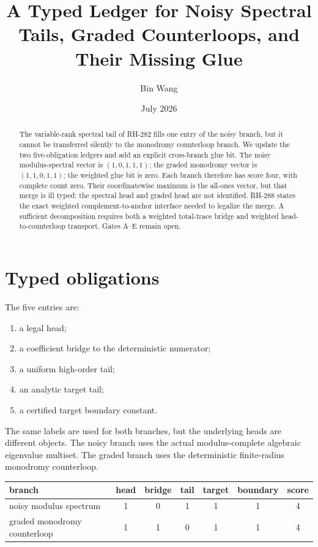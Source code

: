 \documentclass[11pt]{article}
\title{A Typed Ledger for Noisy Spectral Tails, Graded Counterloops, and Their Missing Glue}
\author{Bin Wang}\date{July 2026}
\theoremstyle{remark}\newtheorem{remark}[proposition]{Remark}
\begin{document}
\maketitle
\begin{abstract}
The variable-rank spectral tail of RH-282 fills one entry of the noisy branch,
but it cannot be transferred silently to the monodromy counterloop branch.
We update the two five-obligation ledgers and add an explicit cross-branch
glue bit.  The noisy modulus-spectral vector is $(1,0,1,1,1)$; the graded
monodromy vector is $(1,1,0,1,1)$; the weighted glue bit is zero.  Each branch
therefore has score four, with complete count zero.  Their coordinatewise
maximum is the all-ones vector, but that merge is ill typed: the spectral
head and graded head are not identified.  RH-288 states the exact weighted
complement-to-anchor interface needed to legalize the merge.  A sufficient
decomposition requires both a weighted total-trace bridge and weighted
head-to-counterloop transport.  Gates A--E remain open.
\end{abstract}

\section{Typed obligations}
The five entries are:
\begin{enumerate}
 \item a legal head;
 \item a coefficient bridge to the deterministic numerator;
 \item a uniform high-order tail;
 \item an analytic target tail;
 \item a certified target boundary constant.
\end{enumerate}
The same labels are used for both branches, but the underlying heads are
different objects.  The noisy branch uses the actual modulus-complete
algebraic eigenvalue multiset.  The graded branch uses the deterministic
finite-radius monodromy counterloop.

\begin{center}\small
\begin{tabular}{lccccc|c}\toprule
branch & head & bridge & tail & target & boundary & score\\\midrule
noisy modulus spectrum & 1&0&1&1&1&4\\
graded monodromy counterloop & 1&1&0&1&1&4\\\bottomrule
\end{tabular}
\end{center}
\end{document}
